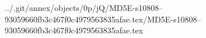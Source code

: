 ../.git/annex/objects/0p/jQ/MD5E-s10808--93059660fb3c467f0c4979563835afae.tex/MD5E-s10808--93059660fb3c467f0c4979563835afae.tex